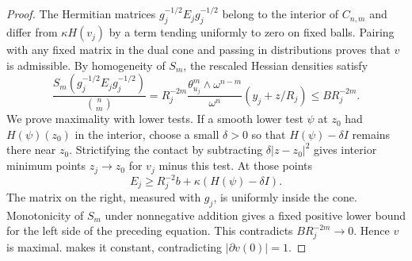 \begin{proof}
The Hermitian matrices $g_j^{-1/2}E_jg_j^{-1/2}$ belong to the interior of $C_{n,m}$ and differ from $\kappa H(v_j)$ by a term tending uniformly to zero on fixed balls. Pairing with any fixed matrix in the dual cone and passing in distributions proves that $v$ is admissible.
By homogeneity of $S_m$, the rescaled Hessian densities satisfy
\[
 \frac{S_m(g_j^{-1/2}E_jg_j^{-1/2})}{\binom nm}
   =R_j^{-2m}\frac{\theta_{u_j}^m\wedge\omega^{n-m}}{\omega^n}
      (y_j+z/R_j)\leq BR_j^{-2m}.
\]
We prove maximality with lower tests. If a smooth lower test $\psi$ at $z_0$ had $H(\psi)(z_0)$ in the interior, choose a small $\delta>0$ so that $H(\psi)-\delta I$ remains there near $z_0$. Strictifying the contact by subtracting $\delta|z-z_0|^2$ gives interior minimum points $z_j\to z_0$ for $v_j$ minus this test. At those points
\[
 E_j\geq R_j^{-2}b+\kappa(H(\psi)-\delta I).
\]
The matrix on the right, measured with $g_j$, is uniformly inside the cone. Monotonicity of $S_m$ under nonnegative addition gives a fixed positive lower bound for the left side of the preceding equation. This contradicts $BR_j^{-2m}\to0$.
Hence $v$ is maximal.  makes it constant, contradicting $|\partial v(0)|=1$.
\end{proof}
